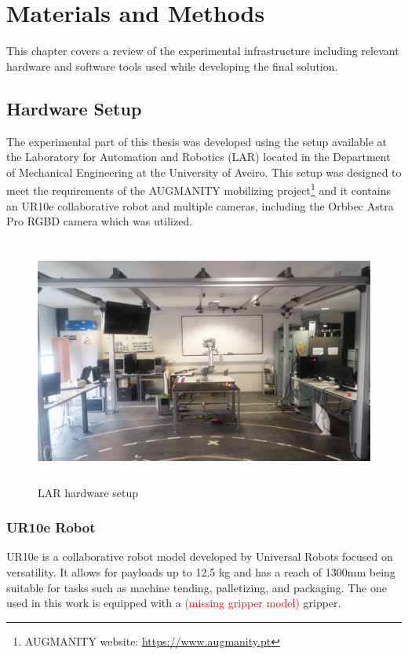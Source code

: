 \chapter{Materials and Methods}
\label{chapter:materials_and_methods}

This chapter covers a review of the experimental infrastructure including relevant hardware and software tools used while developing the final solution.

\section{Hardware Setup}

The experimental part of this thesis was developed using the setup available at the Laboratory for Automation and Robotics (LAR) located in the Department of Mechanical Engineering at the University of Aveiro. This setup was designed to meet the requirements of the AUGMANITY mobilizing project\footnote{AUGMANITY website: \url{https://www.augmanity.pt}} and it contains an UR10e collaborative robot and multiple cameras, including the Orbbec Astra Pro RGBD camera which was utilized.

\begin{figure}[h]
\centerline{\includegraphics[height=3.2in]{figs/setup2.jpg}}
\caption[setup]{LAR hardware setup}
\label{fig:ur10e}
\end{figure}

\subsection{UR10e Robot}

UR10e is a collaborative robot model developed by Universal Robots focused on versatility. It allows for payloads up to 12.5 kg and has a reach of 1300mm being suitable for tasks such as machine tending, palletizing, and packaging\cite{UR10e}. The one used in this work is equipped with a \textcolor{red}{(missing gripper model)} gripper.

